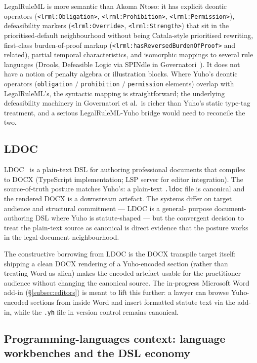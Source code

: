 LegalRuleML is more semantic than Akoma Ntoso: it has explicit
deontic operators (\texttt{<lrml:Obligation>},
\texttt{<lrml:Prohibition>}, \texttt{<lrml:Permission>}), defeasibility
markers (\texttt{<lrml:Override>}, \texttt{<lrml:Strength>}) that sit
in the prioritised-default neighbourhood without being Catala-style
prioritised rewriting, first-class burden-of-proof markup
(\texttt{<lrml:hasReversedBurdenOfProof>} and related), partial
temporal characteristics, and isomorphic mappings to several rule
languages (Drools, Defeasible Logic via SPINdle in
Governatori~\cite{governatori2005ruleml}). It does not have a notion
of penalty algebra or illustration blocks. Where Yuho's deontic
operators (\texttt{obligation} / \texttt{prohibition} /
\texttt{permission} elements) overlap with LegalRuleML's, the
syntactic mapping is straightforward; the underlying defeasibility
machinery in Governatori et al.\ is richer than Yuho's static type-tag
treatment, and a serious LegalRuleML-Yuho bridge would need to
reconcile the two.

\subsection{LDOC}
\label{subsec:rel_ldoc}

LDOC~\cite{ldoc} is a plain-text DSL for authoring professional
documents that compiles to DOCX (TypeScript implementation; LSP
server for editor integration). The source-of-truth posture
matches Yuho's: a plain-text \texttt{.ldoc} file is canonical and
the rendered DOCX is a downstream artefact. The systems differ on
target audience and structural commitment --- LDOC is a general-
purpose document-authoring DSL where Yuho is statute-shaped --- but
the convergent decision to treat the plain-text source as canonical
is direct evidence that the posture works in the legal-document
neighbourhood.

The constructive borrowing from LDOC is the DOCX transpile target
itself: shipping a clean DOCX rendering of a Yuho-encoded section
(rather than treating Word as alien) makes the encoded artefact
usable for the practitioner audience without changing the canonical
source. The in-progress Microsoft Word add-in
(\S\ref{subsec:editors}) is meant to lift this further: a lawyer
can browse Yuho-encoded sections from inside Word and insert
formatted statute text via the add-in, while the \texttt{.yh} file
in version control remains canonical.

\subsection{Programming-languages context: language workbenches and the
DSL economy}
\label{subsec:rel_pl}

